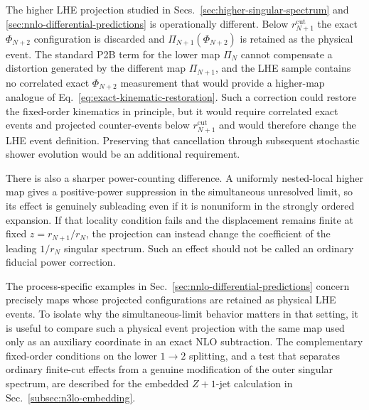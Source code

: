 \documentclass[11pt]{article}
\newcommand{\rn}{r_N}
\newcommand{\rnp}{r_{N+1}}
\newcommand{\cut}{\mathrm{cut}}
\newcommand{\Ph}{\Phi}
\begin{document}
The higher LHE projection studied in Secs.~\ref{sec:higher-singular-spectrum} and
\ref{sec:nnlo-differential-predictions} is operationally different. Below $\rnp^{\cut}$ the exact
$\Ph_{N+2}$ configuration is discarded and $\Pi_{N+1}(\Ph_{N+2})$ is retained as the physical event. The
standard P2B term for the lower map $\Pi_N$ cannot compensate a distortion generated by the different map
$\Pi_{N+1}$, and the LHE sample contains no correlated exact $\Ph_{N+2}$ measurement that would provide a
higher-map analogue of Eq.~\eqref{eq:exact-kinematic-restoration}. Such a correction could restore the
fixed-order kinematics in principle, but it would require correlated exact events and projected counter-events
below $\rnp^{\cut}$ and would therefore change the LHE event definition. Preserving that cancellation through
subsequent stochastic shower evolution would be an additional requirement.

There is also a sharper power-counting difference. A uniformly nested-local higher map gives a positive-power
suppression in the simultaneous unresolved limit, so its effect is genuinely subleading even if it is
nonuniform in the strongly ordered expansion. If that locality condition fails and the displacement remains
finite at fixed $z=\rnp/\rn$, the projection can instead change the coefficient of the leading $1/\rn$
singular spectrum. Such an effect should not be called an ordinary fiducial power correction.

The process-specific examples in Sec.~\ref{sec:nnlo-differential-predictions} concern precisely maps whose
projected configurations are retained as physical LHE events. To isolate why the simultaneous-limit behavior
matters in that setting, it is useful to compare such a physical event projection with the same map used only
as an auxiliary coordinate in an exact NLO subtraction.
The complementary fixed-order conditions on the lower $1\to2$ splitting, and a test that separates ordinary
finite-cut effects from a genuine modification of the outer singular spectrum, are described for the
embedded $Z+1$-jet calculation in Sec.~\ref{subsec:n3lo-embedding}.
\end{document}
